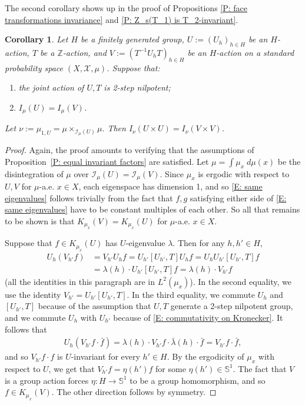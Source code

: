 \documentclass[11pt]{amsart}
\newtheorem{corollary}[lemma]{Corollary}
\theoremstyle{definition}
\renewcommand{\S}{\mathbb{S}}
\newcommand{\Z}{{\mathbb Z}}
\newcommand{\CI}{{\mathcal I}}
\newcommand{\CX}{{\mathcal X}}
\newcommand{\inv}{^{-1}}
\newcommand{\1}{{\mathbf{1}}}
\begin{document}
The second corollary shows up in the proof of Propositions \ref{P: face transformations invariance} and \ref{P: Z_s(T_1) is T_2-invariant}.
\begin{corollary}\label{C: equal invariant factors 3}
    Let $H$ be a finitely generated group, $U:=(U_h)_{h\in H}$ be an $H$-action, $T$ be a $\Z$-action, and $V := (T\inv U_h T)_{h\in H}$ be an $H$-action on a standard probability space $(X, \CX, \mu)$. Suppose that:
    \begin{enumerate}
        \item the joint action of $U,T$ is 2-step nilpotent;
        \item $I_\mu(U)=I_\mu(V)$.
    \end{enumerate}
     Let $\nu := \mu_{1,U}=\mu\times_{\CI_{\mu}(U)}\mu.$ 
    Then $I_\nu(U\times U) = I_\nu(V\times V)$. 
\end{corollary}
\begin{proof}
Again, the proof amounts to verifying that the assumptions of Proposition~\ref{P: equal invariant factors} are satisfied. Let $\mu = \int \mu_x\; d\mu(x)$ be the disintegration of $\mu$ over $\CI_\mu(U) = \CI_\mu(V)$. Since $\mu_x$ is ergodic with respect to $U, V$ for $\mu$-a.e. $x\in X$, each eigenspace has dimension 1, and so \eqref{E: same eigenvalues} follows trivially from the fact that $f,g$ satisfying either side of \eqref{E: same eigenvalues} have to be constant multiples of each other. So all that remains to be shown is that $K_{\mu_x}(V) = K_{\mu_x}(U)$ for $\mu$-a.e. $x\in X$.

Suppose that $f\in K_{\mu_x}(U)$ has $U$-eigenvalue $\lambda$. 
    Then for any $h,h'\in H$,
    \begin{align*}
        U_h(V_{h'} f) &= V_{h'}U_hf= U_{h'}[U_{h'},T]U_h f = U_h U_{h'}[U_{h'},T] f\\
        &= \lambda(h)\cdot U_{h'}[U_{h'},T]f = \lambda(h)\cdot V_{h'}f
    \end{align*}
    (all the identities in this paragraph are in $L^2(\mu_x)$).
In the second equality, we use the identity $V_{h'}= U_{h'}[U_{h'},T]$. In the third equality, we commute $U_h$ and $[U_{h'},T]$ because of the assumption that $U,T$ generate a 2-step nilpotent group, and we commute $U_h$ with $U_{h'}$ because of  \eqref{E: commutativity on Kronecker}. It follows that 
\begin{align*}
    U_h(V_{h'}f\cdot \bar f) = \lambda(h)\cdot V_{h'}f\cdot \bar\lambda(h)\cdot \bar f = V_{h'}f\cdot \bar f,
\end{align*}
and so $V_{h'}f\cdot f$ is $U$-invariant for every $h'\in H$. By the ergodicity of $\mu_x$ with respect to $U$, we get that $V_{h'}f = \eta(h')f$ for some $\eta(h')\in\S^1$. The fact that $V$ is a group action forces $\eta:H\to\S^1$ to be a group homomorphism, and so $f\in K_{\mu_x}(V)$. The other direction follows by symmetry.
\end{proof}
\end{document}
